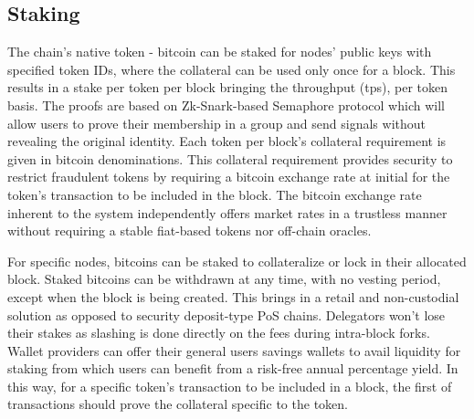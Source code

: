 \documentclass[a4paper, 10pt]{extarticle}
\begin{document}
\subsection{Staking}
The chain's native token - bitcoin can be staked for nodes' public keys with specified token IDs, where the collateral can be used only once for a block. This results in a stake per token per block bringing the throughput (tps), per token basis. The proofs are based on Zk-Snark-based Semaphore protocol \cite{semaphore} which will allow users to prove their membership in a group and send signals without revealing the original identity. Each token per block's collateral requirement is given in bitcoin denominations. This collateral requirement provides security to restrict fraudulent tokens by requiring a bitcoin exchange rate at initial for the token's transaction to be included in the block. The bitcoin exchange rate inherent to the system independently offers market rates in a trustless manner without requiring a stable fiat-based tokens nor off-chain oracles. 

For specific nodes, bitcoins can be staked to collateralize or lock in their allocated block. Staked bitcoins can be withdrawn at any time, with no vesting period, except when the block is being created. This brings in a retail and non-custodial solution as opposed to security deposit-type PoS chains. Delegators won't lose their stakes as slashing is done directly on the fees during intra-block forks. Wallet providers can offer their general users savings wallets to avail liquidity for staking from which users can benefit from a risk-free annual percentage yield. In this way, for a specific token's transaction to be included in a block, the first of transactions should prove the collateral specific to the token.
\end{document}
